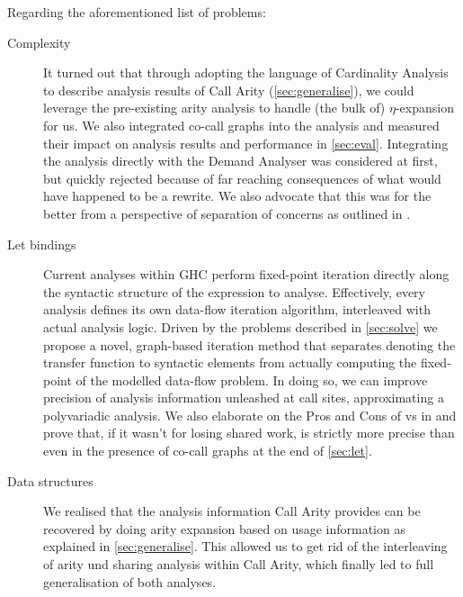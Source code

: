 Regarding the aforementioned list of problems:
\begin{description}
  \item[Complexity]
    It turned out that through adopting the language of Cardinality Analysis to describe analysis results of Call Arity (\cf \cref{sec:generalise}), we could leverage the pre-existing arity analysis to handle (the bulk of) $\eta$-expansion for us.
    We also integrated co-call graphs into the analysis and measured their impact on analysis results and performance in \cref{sec:eval}.
    Integrating the analysis directly with the Demand Analyser was considered at first, but quickly rejected because of far reaching consequences of what would have happened to be a rewrite.
    We also advocate that this was for the better from a perspective of separation of concerns as outlined in .
  \item[Let bindings]
    Current analyses within GHC perform fixed-point iteration directly along the syntactic structure of the expression to analyse.
    Effectively, every analysis defines its own data-flow iteration algorithm, interleaved with actual analysis logic.
    Driven by the problems described in \cref{sec:solve} we propose a novel, graph-based iteration method that separates denoting the transfer function to syntactic elements from actually computing the fixed-point of the modelled data-flow problem.
    In doing so, we can improve precision of analysis information unleashed at call sites, approximating a polyvariadic analysis.
    We also elaborate on the Pros and Cons of  vs  in \textcite{card} and prove that, if it wasn't for losing shared work,  is strictly more precise than  even in the presence of co-call graphs at the end of \cref{sec:let}.
  \item[Data structures]
    We realised that the analysis information Call Arity provides can be recovered by doing arity expansion based on usage information as explained in \cref{sec:generalise}.
    This allowed us to get rid of the interleaving of arity und sharing analysis within Call Arity, which finally led to full generalisation of both analyses.
\end{description}
